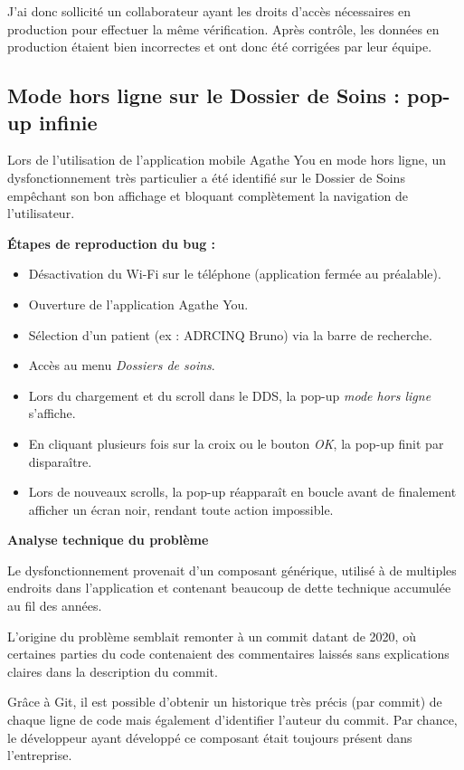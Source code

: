 \documentclass{article}
\begin{document}
J'ai donc sollicité un collaborateur ayant les droits d'accès nécessaires en production pour effectuer la même vérification. Après contrôle, les données en production étaient bien incorrectes et ont donc été corrigées par leur équipe.

\subsection{ Mode hors ligne sur le Dossier de Soins : pop-up infinie}

Lors de l'utilisation de l'application mobile Agathe You en mode hors ligne, un dysfonctionnement très particulier a été identifié sur le Dossier de Soins empêchant son bon affichage et bloquant complètement la navigation de l'utilisateur.

\textbf{Étapes de reproduction du bug :}

\begin{itemize}
    \item Désactivation du Wi-Fi sur le téléphone (application fermée au préalable).
    \item Ouverture de l'application Agathe You.
    \item Sélection d'un patient (ex : ADRCINQ Bruno) via la barre de recherche.
    \item Accès au menu \textit{Dossiers de soins}.
    \item Lors du chargement et du scroll dans le DDS, la pop-up \textit{mode hors ligne} s'affiche.
    \item En cliquant plusieurs fois sur la croix ou le bouton \textit{OK}, la pop-up finit par disparaître.
    \item Lors de nouveaux scrolls, la pop-up réapparaît en boucle avant de finalement afficher un écran noir, rendant toute action impossible.
\end{itemize}

\textbf{ Analyse technique du problème}

Le dysfonctionnement provenait d'un composant générique, utilisé à de multiples endroits dans l'application et contenant beaucoup de dette technique accumulée au fil des années.

L'origine du problème semblait remonter à un commit datant de 2020, où certaines parties du code contenaient des commentaires laissés sans explications claires dans la description du commit.

Grâce à Git, il est possible d'obtenir un historique très précis (par commit) de chaque ligne de code mais également d'identifier l'auteur du commit. Par chance, le développeur ayant développé ce composant était toujours présent dans l'entreprise.
\end{document}
